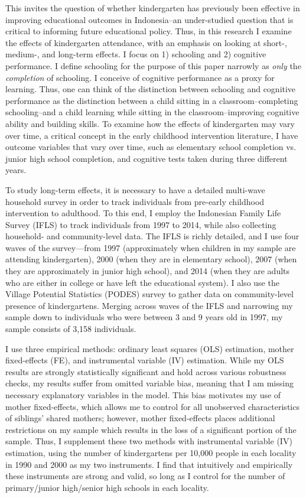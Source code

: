 This invites the question of whether kindergarten has previously been effective in improving educational outcomes in Indonesia--an under-studied question that is critical to informing future educational policy. Thus, in this research I examine the effects of kindergarten attendance, with an emphasis on looking at short-, medium-, and long-term effects. I focus on 1) schooling and 2) cognitive performance. I define schooling for the purpose of this paper narrowly as \textit{only} the \textit{completion} of schooling. I conceive of cognitive performance as a proxy for learning. Thus, one can think of the distinction between schooling and cognitive performance as the distinction between a child sitting in a classroom--completing schooling--and a child learning while sitting in the classroom--improving cognitive ability and building skills. To examine how the effects of kindergarten may vary over time, a critical concept in the early childhood intervention literature, I have outcome variables that vary over time, such as elementary school completion vs. junior high school completion, and cognitive tests taken during three different years. 

To study long-term effects, it is necessary to have a detailed multi-wave household survey in order to track individuals from pre-early childhood intervention to adulthood. To this end, I employ the Indonesian Family Life Survey (IFLS) to track individuals from 1997 to 2014, while also collecting household- and community-level data. The IFLS is richly detailed, and I use four waves of the survey—from 1997 (approximately when children in my sample are attending kindergarten), 2000 (when they are in elementary school), 2007 (when they are approximately in junior high school), and 2014 (when they are adults who are either in college or have left the educational system). I also use the Village Potential Statistics (PODES) survey to gather data on community-level presence of kindergartens. Merging across waves of the IFLS and narrowing my sample down to individuals who were between 3 and 9 years old in 1997, my sample consists of 3,158 individuals.

I use three empirical methods: ordinary least squares (OLS) estimation, mother fixed-effects (FE), and instrumental variable (IV) estimation. While my OLS results are strongly statistically significant and hold across various robustness checks, my results suffer from omitted variable bias, meaning that I am missing necessary explanatory variables in the model. This bias motivates my use of mother fixed-effects, which allows me to control for all unobserved characteristics of siblings' shared mothers; however, mother fixed-effects places additional restrictions on my sample which results in the loss of a significant portion of the sample. Thus, I supplement these two methods with instrumental variable (IV) estimation, using the number of kindergartens per 10,000 people in each locality in 1990 and 2000 as my two instruments. I find that intuitively and empirically these instruments are strong and valid, so long as I control for the number of primary/junior high/senior high schools in each locality.

